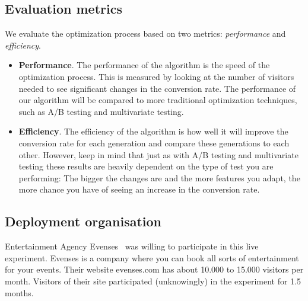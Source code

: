 \documentclass{report}
\begin{document}
\subsection{Evaluation metrics}
We evaluate the optimization process based on two metrics: \textit{performance} and \textit{efficiency}.
\begin{itemize}
	\item \textbf{Performance}. The performance of the algorithm is the speed of the optimization process. This is measured by looking at the number of visitors needed to see significant changes in the conversion rate. The performance of our algorithm will be compared to more traditional optimization techniques, such as A/B testing and multivariate testing.
	\item \textbf{Efficiency}. The efficiency of the algorithm is how well it will improve the conversion rate for each generation and compare these generations to each other. However, keep in mind that just as with A/B testing and multivariate testing these results are heavily dependent on the type of test you are performing: The bigger the changes are and the more features you adapt, the more chance you have of seeing an increase in the conversion rate.
\end{itemize}

\subsection{Deployment organisation}
Entertainment Agency Evenses~\cite{evenses} was willing to participate in this live experiment. Evenses is a company where you can book all sorts of entertainment for your events. Their website evenses.com has about 10.000 to 15.000 visitors per month. Visitors of their site participated (unknowingly) in the experiment for 1.5 months.
\end{document}
